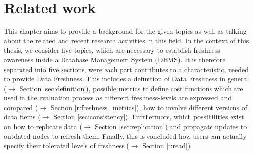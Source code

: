 
\chapter{Related work}
\label{c:related}


This chapter aims to provide a background for the given topics as well as talking about the related and recent research 
activities in this field. In the context of this thesis, we consider five topics, which are necessary to establish 
freshness-awareness inside a Database Management System (DBMS).
It is therefore separated into five sections, were each part contributes to a characteristic, needed to 
provide Data Freshness. This includes a definition of Data Freshness in general ($\rightarrow$ Section \ref{sec:definition}), 
possible metrics to define cost functions which are used
in the evaluation process as different freshness-levels are expressed and compared ($\rightarrow$ Section \ref{r:freshness_metrics}), 
how to involve different versions of data items ($\rightarrow$ Section \ref{sec:consistency}). 
Furthermore, which possibilities exist on how to replicate data ($\rightarrow$ Section \ref{sec:replication}) 
and propagate updates to outdated nodes to refresh them.
Finally, this is concluded how users can actually specify their tolerated levels of freshness ($\rightarrow$ Section \ref{r:read}).




